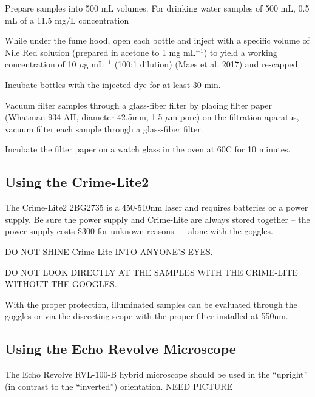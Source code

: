 \documentclass[12pt]{../SOP4_alpha}\usepackage[]{graphicx}\usepackage[]{color}
\begin{document}
\NP Prepare samples into 500 mL volumes. For drinking water samples of 500 mL, 0.5 mL of a 11.5 mg/L concentration 

\NP While under the fume hood, open each bottle and inject with a specific volume of Nile Red solution (prepared in acetone to 1 mg mL$^{-1}$) to yield a working concentration of 10 $\mu$g mL$^{-1}$ (100:1 dilution) (Maes et al. 2017) and re-capped. 

\NP Incubate bottles with the injected dye for at least 30 min. 

\NP Vacuum filter samples through a glass-fiber filter by placing filter paper (Whatman 934-AH, diameter 42.5mm, 1.5 $\mu$m pore) on the filtration aparatus, vacuum filter each sample through a glass-fiber filter.



\NP Incubate the filter paper on a watch glass in the oven at 60C for 10 minutes.


\subsection{Using the Crime-Lite2}

\NP The Crime-Lite2 2BG2735 is a 450-510nm laser and requires batteries or a power supply. Be sure the power supply and Crime-Lite are always stored together -- the power supply costs \$300 for unknown reasons --- alone with the goggles.

\NP DO NOT SHINE Crime-Lite INTO ANYONE'S EYES.

\NP DO NOT LOOK DIRECTLY AT THE SAMPLES WITH THE CRIME-LITE WITHOUT THE GOOGLES.

\NP With the proper protection, illuminated samples can be evaluated through the goggles or via the discecting  scope with the proper filter installed at 550nm. 
  
\subsection{Using the Echo Revolve Microscope}

\NP The Echo Revolve RVL-100-B hybrid microscope should be used in the ``upright'' (in contrast to the ``inverted'') orientation. NEED PICTURE
\end{document}

